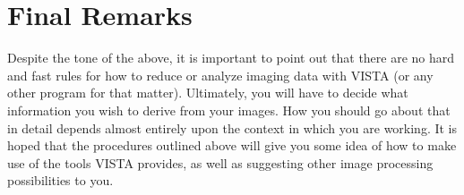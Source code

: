 
\section{Final Remarks}

Despite the tone of the above, it is important to point out that there are no
hard and fast rules for how to reduce or analyze imaging data with VISTA (or
any other program for that matter).  Ultimately, you will have to decide what
information you wish to derive from your images.  How you should go about that
in detail depends almost entirely upon the context in which you are working.
It is hoped that the procedures outlined above will give you some idea of how
to make use of the tools VISTA provides, as well as suggesting other image
processing possibilities to you. 

%
